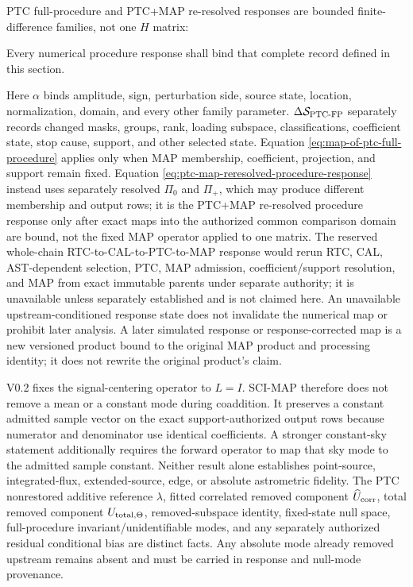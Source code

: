 \documentclass[10pt]{article}
\begin{document}
PTC full-procedure and PTC+MAP re-resolved responses are bounded
finite-difference families, not one \(H\) matrix:

\SCIMapProcedureResponseEquations

\SCIMapComparisonSpaceDefinition

Every numerical procedure response shall bind that complete
\SCIMapComparisonSpaceRecordId{} record defined in this section.

Here \(\alpha\) binds amplitude, sign, perturbation side, source state,
location, normalization, domain, and every other family parameter.
\(\Delta\mathcal S_{{\rm PTC}\text{-}{\rm FP}}\) separately
records changed masks, groups, rank, loading subspace, classifications,
coefficient state, stop cause, support, and other selected state. Equation
\eqref{eq:map-of-ptc-full-procedure} applies only when MAP membership,
coefficient, projection, and support remain fixed. Equation
\eqref{eq:ptc-map-reresolved-procedure-response} instead uses separately
resolved \(\Pi_0\) and \(\Pi_+\), which may produce different membership and
output rows; it is the PTC+MAP re-resolved procedure response only after exact
maps into the authorized common comparison domain are bound, not the fixed MAP
operator applied to one matrix. The reserved
whole-chain RTC-to-CAL-to-PTC-to-MAP response would rerun RTC, CAL,
AST-dependent selection, PTC, MAP admission, coefficient/support resolution,
and MAP from exact immutable parents under separate authority; it is
unavailable unless separately established and is not claimed here. An
unavailable upstream-conditioned response state does not invalidate the numerical map
or prohibit later analysis. A
later simulated response or response-corrected map is a new versioned product
bound to the original MAP product and processing identity; it does not rewrite
the original product's claim.

V0.2 fixes the signal-centering operator to \(L=I\). SCI-MAP therefore does not
remove a mean or a constant mode during coaddition. It preserves a constant
admitted sample vector on the exact support-authorized output rows because
numerator and denominator use identical coefficients. A stronger constant-sky
statement additionally requires the forward operator to map that sky mode to
the admitted sample constant. Neither result alone establishes point-source,
integrated-flux, extended-source, edge, or absolute astrometric fidelity. The
PTC nonrestored additive reference \(\lambda\), fitted correlated removed
component \(\widehat U_{\rm corr}\), total removed component
\(U_{{\rm total},\Theta}\), removed-subspace identity, fixed-state null space,
full-procedure invariant/unidentifiable modes, and any separately authorized
residual conditional bias are distinct facts. Any absolute mode already
removed upstream remains absent and must be carried in response and null-mode
provenance.
\end{document}
